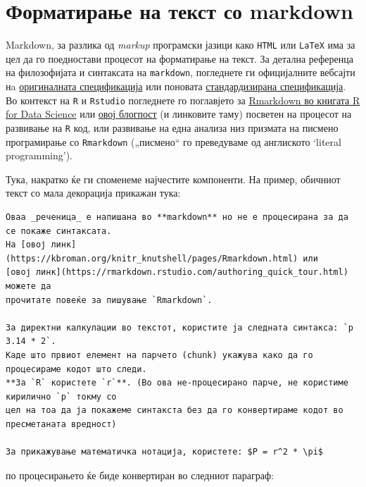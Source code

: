 \documentclass[
]{book}
\begin{document}
\hypertarget{ux444ux43eux440ux43cux430ux442ux438ux440ux430ux45aux435-ux43dux430-ux442ux435ux43aux441ux442-ux441ux43e-markdown}{%
\section{Форматирање на текст со markdown}\label{ux444ux43eux440ux43cux430ux442ux438ux440ux430ux45aux435-ux43dux430-ux442ux435ux43aux441ux442-ux441ux43e-markdown}}

Markdown, за разлика од \emph{markup} програмски јазици како \texttt{HTML} или \texttt{LaTeX} има за цел да го поедностави процесот на форматирање на текст. За детална референца на филозофијата и синтаксата на \texttt{markdown}, погледнете ги официјалните вебсајти нa \href{https://daringfireball.net/projects/markdown/syntax}{оригиналната спецификација} или поновата \href{https://commonmark.org/}{стандардизирана спецификација}. Во контекст на \texttt{R} и \texttt{Rstudio} погледнете го поглавјето за \href{https://r4ds.had.co.nz/r-markdown.html}{Rmarkdown во книгата R for Data Science} или \href{https://emilyriederer.netlify.app/post/rmarkdown-driven-development/}{овој блогпост} (и линковите таму) посветен на процесот на развивање на \texttt{R} код, или развивање на една анализа низ призмата на писмено програмирање со \texttt{Rmarkdown} („писмено`` го преведуваме од англиското `literal programming').

Тука, накратко ќе ги споменеме најчестите компоненти. На пример, обичниот текст со мала декорација прикажан тука:

\begin{verbatim}
Оваа _реченица_ е напишана во **markdown** но не е процесирана за да се покаже синтаксата. 
На [овој линк](https://kbroman.org/knitr_knutshell/pages/Rmarkdown.html) или 
[овој линк](https://rmarkdown.rstudio.com/authoring_quick_tour.html) можете да 
прочитате повеќе за пишување `Rmarkdown`. 

За директни калкулации во текстот, користите ja следната синтакса: `р 3.14 * 2`. 
Kаде што првиот елемент на парчето (chunk) укажува како да го процесираме кодот што следи. 
**За `R` користете `r`**. (Во ова не-процесирано парче, не користиме кирилично `р` токму со
цел на тоа да ја покажеме синтакста без да го конвертираме кодот во пресметаната вредност)

За прикажување математичка нотација, користете: $P = r^2 * \pi$
\end{verbatim}

по процесирањето ќе биде конвертиран во следниот параграф:
\end{document}
